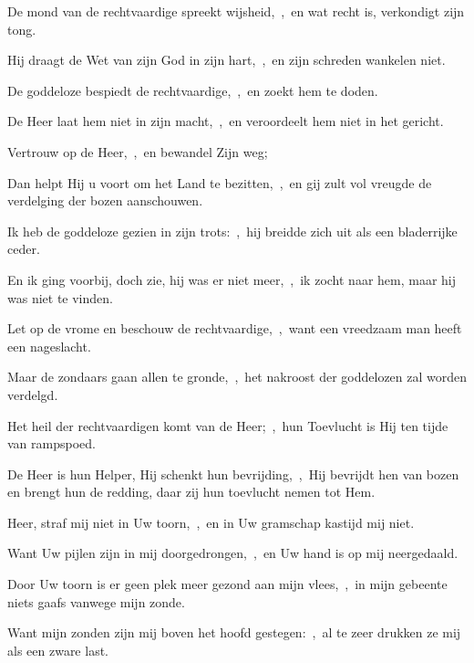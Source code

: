 \documentclass[12pt,twoside,a5paper]{article}
\begin{document}

\begin{halfparskip}
  De mond van de rechtvaardige spreekt wijsheid,~\sep\ en wat recht is, verkondigt zijn tong.

  Hij draagt de Wet van zijn God in zijn hart,~\sep\ en zijn schreden wankelen niet.

  De goddeloze bespiedt de rechtvaardige,~\sep\ en zoekt hem te doden.

  De Heer laat hem niet in zijn macht,~\sep\ en veroordeelt hem niet in het gericht.

  Vertrouw op de Heer,~\sep\ en bewandel Zijn weg;

  Dan helpt Hij u voort om het Land te bezitten,~\sep\ en gij zult vol vreugde de verdelging der bozen aanschouwen.
\end{halfparskip}


\begin{halfparskip}
  Ik heb de goddeloze gezien in zijn trots:~\sep\ hij breidde zich uit als een bladerrijke ceder.

  En ik ging voorbij, doch zie, hij was er niet meer,~\sep\ ik zocht naar hem, maar hij was niet te vinden.

  Let op de vrome en beschouw de rechtvaardige,~\sep\ want een vreedzaam man heeft een nageslacht.

  Maar de zondaars gaan allen te gronde,~\sep\ het nakroost der goddelozen zal worden verdelgd.

  Het heil der rechtvaardigen komt van de Heer;~\sep\ hun Toevlucht is Hij ten tijde van rampspoed.

  De Heer is hun Helper, Hij schenkt hun bevrijding,~\sep\ Hij bevrijdt hen van bozen en brengt hun de redding, daar zij hun toevlucht nemen tot Hem.
\end{halfparskip}





\begin{halfparskip}
  Heer, straf mij niet in Uw toorn,~\sep\ en in Uw gramschap kastijd mij niet.


  Want Uw pijlen zijn in mij doorgedrongen,~\sep\ en Uw hand is op mij neergedaald.

  Door Uw toorn is er geen plek meer gezond aan mijn vlees,~\sep\ in mijn gebeente niets gaafs vanwege mijn zonde.

  Want mijn zonden zijn mij boven het hoofd gestegen:~\sep\ al te zeer drukken ze mij als een zware last.
\end{halfparskip}
\end{document}
